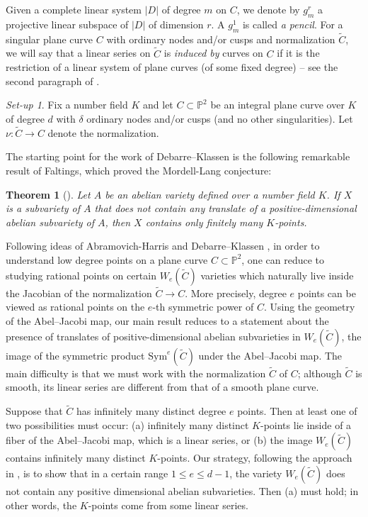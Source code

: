 \documentclass[fontsize=11pt,reqno]{amsart}
\newtheorem{theorem}[thm]{Theorem}
\theoremstyle{definition}
\theoremstyle{remark}
\newtheorem{setup}[thm]{Set-up}
\newcommand{\tC}{\widetilde{C}}
\renewcommand{\P}{\mathbb{P}}
\newcommand{\Sym}{\mathrm{Sym}}
\begin{document}
Given a complete linear system $|D|$ of degree $m$ on $C$, we denote by $g^r_m$ a projective linear subspace of $|D|$ of dimension $r$.  A $g^1_m$ is called \textit{a pencil}. For a singular plane curve $C$ with ordinary nodes and/or cusps and normalization $\tC$, we will say that a linear series on $\tC$ is \textit{induced by} curves on $C$ if it is the restriction of a linear system of plane curves (of some fixed degree) -- see the second paragraph of \cite{CK91}.

\begin{setup}\label{Setup}
    Fix a number field $K$ and let $C \subset \P^{2}$ be an integral plane curve over $K$ of degree $d$ with $\delta$ ordinary nodes and/or cusps (and no other singularities). Let $\nu \colon \tC \rightarrow C$ denote the normalization.
\end{setup}

The starting point for the work of Debarre--Klassen \cite{DK94} is the following remarkable result of Faltings, which proved the Mordell-Lang conjecture:

\begin{theorem}[\cite{Faltings91}]\label{thm:Faltings} Let $A$ be an abelian variety defined over a number field $K$. If $X$ is a subvariety of $A$ that does not contain any translate of a positive-dimensional abelian subvariety of $A$, then $X$ contains only finitely many $K$-points.\end{theorem}

\noindent Following ideas of Abramovich-Harris \cite{AH91} and Debarre--Klassen \cite{DK94}, in order to understand low degree points on a plane curve $C \subset \P^{2}$, one can reduce to studying rational points on certain $W_{e}(\tC)$ varieties which naturally live inside the Jacobian of the normalization $\tC \rightarrow C$. More precisely, degree $e$ points can be viewed as rational points on the $e$-th symmetric power of $C$. Using the geometry of the Abel--Jacobi map, our main result reduces to a statement about the presence of translates of positive-dimensional abelian subvarieties in $W_e(\tC)$, the image of the symmetric product $\Sym^e(\tC)$ under the Abel--Jacobi map. The main difficulty is that we must work with the normalization $\tC$ of $C$; although $\tC$ is smooth, its linear series are different from that of a smooth plane curve.

Suppose that $\tC$ has infinitely many distinct degree $e$ points. Then at least one of two possibilities must occur: (a) infinitely many distinct $K$-points lie inside of a fiber of the Abel--Jacobi map, which is a linear series, or (b) the image $W_{e}(\tC)$ contains infinitely many distinct $K$-points. Our strategy, following the approach in \cite{DK94}, is to show that in a certain range $1 \leq e \leq d-1$, the variety $W_{e}(\tC)$ does not contain any positive dimensional abelian subvarieties. Then (a) must hold; in other words, the $K$-points come from some linear series.
\end{document}

